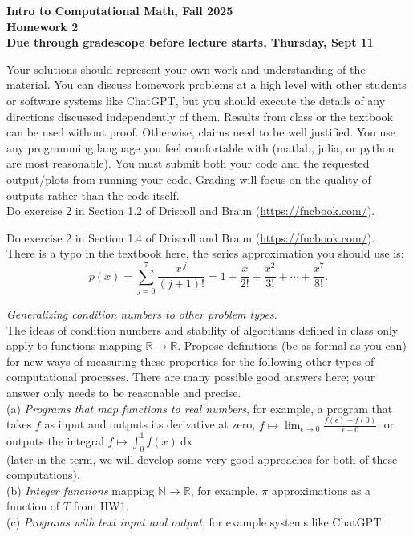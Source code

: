 \documentclass[11pt]{article}
\theoremstyle{definition}
\begin{document}
\begin{center}
{\bf Intro to Computational Math, Fall 2025\\
Homework 2\\
Due through gradescope before lecture starts, Thursday, Sept 11}
\end{center}

Your solutions should represent your own work and understanding of the material. You can discuss homework problems at a high level with other students or software systems like ChatGPT, but you should execute the details of any directions discussed independently of them. Results from class or the textbook can be used without proof. Otherwise, claims need to be well justified. You use any programming language you feel comfortable with (matlab, julia, or python are most reasonable). You must submit both your code and the requested output/plots from running your code. Grading will focus on the quality of outputs rather than the code itself.\\

 Do exercise 2 in Section 1.2 of Driscoll and Braun (\url{https://fncbook.com/}).


\vskip1cm

 Do exercise 2 in Section 1.4 of Driscoll and Braun (\url{https://fncbook.com/}). \\
 There is a typo in the textbook here, the series approximation you should use is:
 $$ p(x)=\sum_{j=0}^{7}\frac{x^{\,j}}{(j+1)!}
=1+\frac{x}{2!}+\frac{x^{2}}{3!}+\cdots+\frac{x^{7}}{8!} . $$


\vskip1cm


 {\it Generalizing condition numbers to other problem types.}\\
The ideas of condition numbers and stability of algorithms defined in class only apply to functions mapping $\mathbb{R}\rightarrow \mathbb{R}$. Propose definitions (be as formal as you can) for new ways of measuring these properties for the following other types of computational processes. There are many possible good answers here; your answer only needs to be reasonable and precise.\\[6pt]
(a) {\it Programs that map functions to real numbers}, for example, a program that takes $f$ as input and outputs its derivative at zero, $f\mapsto \lim_{\epsilon\rightarrow 0}\frac{f(\epsilon)-f(0)}{\epsilon-0}$, or outputs the integral $f\mapsto \int^1_0 f(x)\ \mathrm{dx}$ \\
(later in the term, we will develop some very good approaches for both of these computations).\\[6pt]
(b) {\it Integer functions} mapping $\mathbb{N} \rightarrow \mathbb{R}$, for example, $\pi$ approximations as a function of $T$ from HW1.\\[6pt]
(c) {\it Programs with text input and output}, for example systems like ChatGPT.
\end{document}
